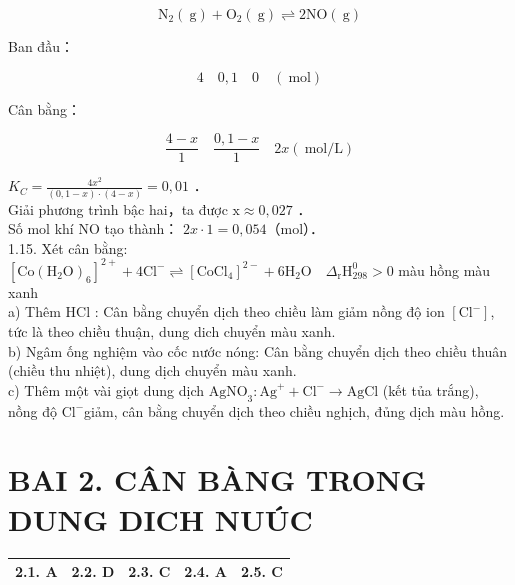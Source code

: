 \documentclass[10pt]{article}
\begin{document}
$$
\mathrm{N}_{2}(\mathrm{~g})+\mathrm{O}_{2}(\mathrm{~g}) \rightleftharpoons 2 \mathrm{NO}(\mathrm{~g})
$$

Ban đầu：

$$
4 \quad 0,1 \quad 0 \quad(\mathrm{~mol})
$$

Cân bằng：

$$
\frac{4-x}{1} \quad \frac{0,1-x}{1} \quad 2 x(\mathrm{~mol} / \mathrm{L})
$$

$K_{C}=\frac{4 x^{2}}{(0,1-x) \cdot(4-x)}=0,01$ ．\\
Giải phương trình bậc hai，ta được $\mathrm{x} \approx 0,027$ ．\\
Số mol khí NO tạo thành： $2 x \cdot 1=0,054$（mol）．\\
1.15. Xét cân bằng:\\
$\left[\mathrm{Co}\left(\mathrm{H}_{2} \mathrm{O}\right)_{6}\right]^{2+}+4 \mathrm{Cl}^{-} \rightleftharpoons\left[\mathrm{CoCl}_{4}\right]^{2-}+6 \mathrm{H}_{2} \mathrm{O} \quad \Delta_{\mathrm{r}} \mathrm{H}_{298}^{0}>0$ màu hồng màu xanh\\
a) Thêm HCl : Cân bằng chuyển dịch theo chiều làm giảm nồng độ ion $\left[\mathrm{Cl}^{-}\right]$, tức là theo chiều thuận, dung dich chuyển màu xanh.\\
b) Ngâm ống nghiệm vào cốc nước nóng: Cân bằng chuyển dịch theo chiều thuân (chiều thu nhiệt), dung dịch chuyển màu xanh.\\
c) Thêm một vài giọt dung dịch $\mathrm{AgNO}_{3}: \mathrm{Ag}^{+}+\mathrm{Cl}^{-} \longrightarrow \mathrm{AgCl}$ (kết tủa trắng), nồng độ $\mathrm{Cl}^{-}$giảm, cân bằng chuyển dịch theo chiều nghịch, đủng dịch màu hồng.

\section*{BAI 2. CÂN BÀNG TRONG DUNG DICH NUÚC}
\begin{center}
\begin{tabular}{|l|l|l|l|l|}
\hline
2.1. A & 2.2. D & 2.3. C & 2.4. A & 2.5. C \\
\hline
\end{tabular}
\end{center}
\end{document}
